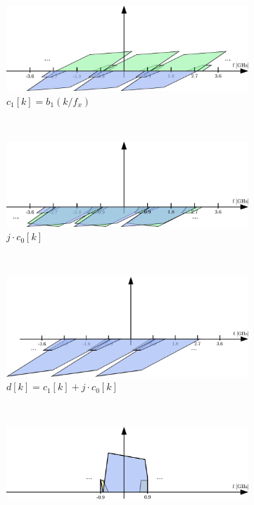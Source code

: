 \begin{figure}[p]
\begin{subfigure}{0.45\textwidth}
    \centering
    \includegraphics[width=\textwidth]{figures/rx_2_freq_c_1}
    \caption{$c_1[k] = b_1(k / f_x)$}
    \label{fig:rx_2_freq_c_1}
  \end{subfigure}
  \vspace{4ex} \\
  \begin{subfigure}{0.45\textwidth}
    \centering
    \includegraphics[width=\textwidth]{figures/rx_2_freq_jc0}
    \caption{$j \cdot c_0[k]$}
    \label{fig:rx_2_freq_jc0}
  \end{subfigure}
  ~
  \begin{subfigure}{0.45\textwidth}
    \centering
    \includegraphics[width=\textwidth]{figures/rx_2_freq_d}
    \caption{$d[k] = c_1[k] + j \cdot c_0[k]$}
    \label{fig:rx_2_freq_d}
  \end{subfigure}
  \vspace{4ex} \\
  \begin{subfigure}{0.45\textwidth}
    \centering
    \includegraphics[width=\textwidth]{figures/rx_2_freq_e}

\end{subfigure}
\end{figure}
